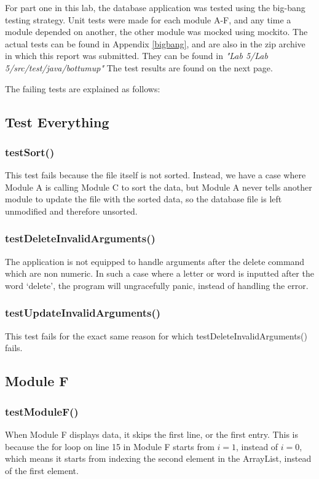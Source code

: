 For part one in this lab, the database application was tested using the big-bang
testing strategy. Unit tests were made for each module A-F, and any time a
module depended on another, the other module was mocked using mockito. The
actual tests can be found in Appendix \ref{bigbang}, and are also in the zip
archive in which this report was submitted. They can be found in
\emph{"Lab 5/Lab 5/src/test/java/bottumup"} The test results are found on the
next page.


The failing tests are explained as follows:
\subsection{Test Everything}
\subsubsection{testSort()}
This test fails because the file itself is not sorted. Instead, we have a case
where Module A is calling Module C to sort the data, but Module A never tells
another module to update the file with the sorted data, so the database file is
left unmodified and therefore unsorted.

\subsubsection{testDeleteInvalidArguments()}
The application is not equipped to handle arguments after the delete command
which are non numeric. In such a case where a letter or word is inputted after
the word `delete', the program will ungracefully panic, instead of handling the
error.

\subsubsection{testUpdateInvalidArguments()}
This test fails for the exact same reason for which
testDeleteInvalidArguments() fails.

\subsection{Module F}
\subsubsection{testModuleF()}
When Module F displays data, it skips the first line, or the first entry. This
is because the for loop on line 15 in Module F starts from $i=1$, instead of
$i=0$, which means it starts from indexing the second element in the ArrayList,
instead of the first element.

